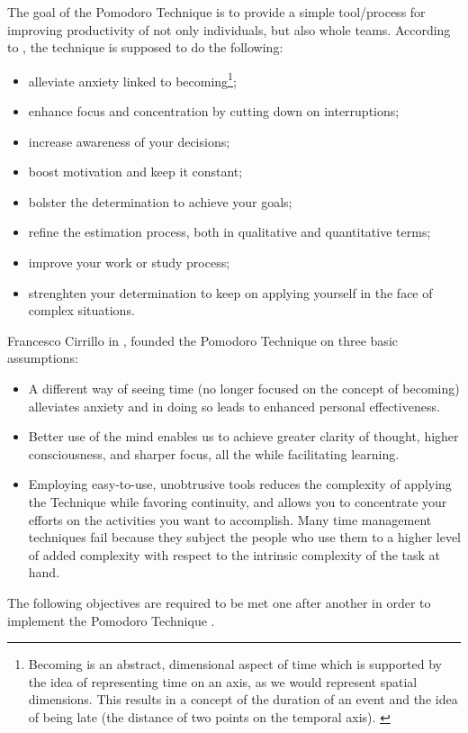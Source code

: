\documentclass[11pt,singleside]{myfithesis2}
\begin{document}
The goal of the Pomodoro Technique is to provide a simple tool/process for improving productivity of not only individuals, but also whole teams. According to \cite{pomodoro}, the technique is supposed to do the following:
\begin{itemize}
	\item alleviate anxiety linked to becoming\footnote{Becoming is an abstract, dimensional aspect of time which is supported by the idea of representing time on an axis,  as we would represent spatial dimensions. This results in a concept of the duration of an event and the idea of being late (the distance of two points on the temporal axis). \cite{pomodoro}};
	\item enhance focus and concentration by cutting down on interruptions;
	\item increase awareness of your decisions;
	\item boost motivation and keep it constant;
	\item bolster the determination to achieve your goals;
	\item refine the estimation process, both in qualitative and quantitative terms;
	\item improve your work or study process;
	\item strenghten your determination to keep on applying yourself in the face of complex situations.
\end{itemize}

Francesco Cirrillo in \cite{pomodoro}, founded the Pomodoro Technique on three basic assumptions:
\begin{itemize}
	\item A different way of seeing time (no longer focused on the concept of becoming) alleviates anxiety and in doing so leads to enhanced personal effectiveness. 
	\item Better use of the mind enables us to achieve greater clarity of thought, higher consciousness, and sharper focus, all the while facilitating learning. 
	\item Employing easy-to-use, unobtrusive tools reduces the complexity of applying the Technique while favoring continuity, and allows you to concentrate your efforts on the 	activities you want to accomplish. Many time management techniques fail because they subject the people who use them to a higher level of added complexity with respect to the intrinsic complexity of the task at hand.
\end{itemize}

The following objectives are required to be met one after another in order to implement the Pomodoro Technique \cite{pomodoro}.
\end{document}
